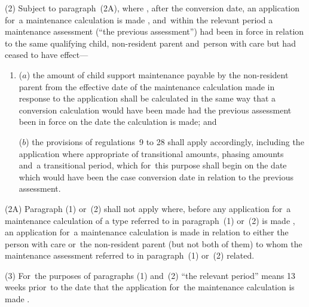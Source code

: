 \documentclass[12pt,a4paper]{article}
\begin{document}
(2) 
Subject to paragraph~(2A), where%
, after the conversion date, an application for~a maintenance calculation is made%
, and~within the relevant period a maintenance assessment (“the previous assessment”) had been in force in relation to the same qualifying child, non-resident parent and~person with care but had ceased to have effect—
\begin{enumerate}\item[]
($a$) the amount of child support maintenance payable by the non-resident parent from the effective date of the maintenance calculation made in response to the application shall be calculated in the same way that a conversion calculation would have been made had the previous assessment been in force on the date the calculation is made; and

($b$) the provisions of regulations~9 to 28 shall apply accordingly, including the application where appropriate of transitional amounts, phasing amounts and~a transitional period, which for~this purpose shall begin on the date which would have been the case conversion date in relation to the previous assessment.
\end{enumerate}

(2A) Paragraph (1) or~(2) shall not apply where, before any application for~a maintenance calculation of a type referred to in paragraph~(1) or~(2) is made%
, an application for~a maintenance calculation is made 
in relation to either the person with care or~the non-resident parent (but not both of them) to whom the maintenance assessment referred to in paragraph~(1) or~(2) related.

(3) For~the purposes of paragraphs (1) and~(2) “the relevant period” means 13 weeks prior~to the date that the application for~the maintenance calculation is made%
.
\end{document}
